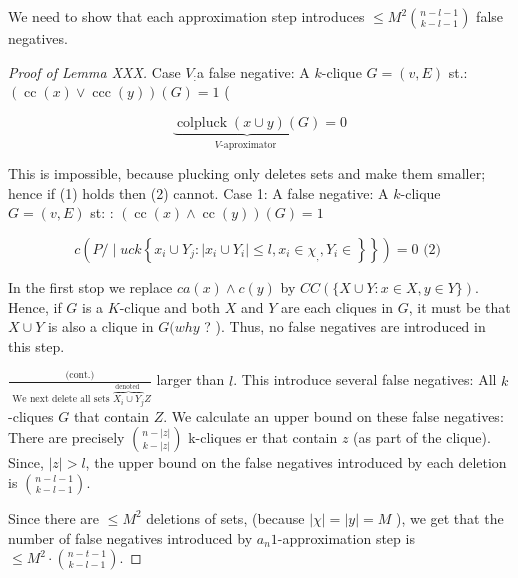 We need to show that each approximation step introduces $\leqslant M^2\binom{n-l-1}{k-l-1}$ false negatives.

\begin{proof}[Proof of Lemma XXX]
Case $V_{:}$a false negative:
A $k$-clique $G=(v, E)$ st.: $(\operatorname{cc}(x) \vee \operatorname{ccc}(y))(G)=1$ (

$$
\underbrace{\operatorname{colpluck}(x \cup y)(G)}_{V \text {-aproximator }}=0
$$


This is impossible, because plucking only deletes sets and make them smaller; hence if (1) holds then (2) cannot.
Case 1:
A false negative:
A $k$-clique $G=(v, E)$ st: : $(\operatorname{cc}(x) \wedge \operatorname{cc}(y))(G)=1$

$$
\left.c\left(P / \mid u c k\left\{x_i \cup Y_j:\left|x_i \cup Y_i\right| \leq l, x_i \in \chi_{,}, Y_i \in\right\}\right\}\right)=0 \text { (2) }
$$


In the first stop we replace $c a(x) \wedge c(y)$ by $C C(\{X \cup Y: x \in X, y \in Y\})$.
Hence, if $G$ is a $K$-clique and both $X$ and $Y$ are each cliques in $G$, it must be that $X \cup Y$ is also a clique in $G(w h y$ ? ). Thus, no false negatives are introduced in this step.


$\frac{\text { (cont.) }}{\text { We next delete all sets } \overbrace{X_i \cup Y_j}^{\text {denoted }} Z}$ larger than $l$. This introduce several false negatives:
All $k$-cliques $G$ that contain $Z$.
We calculate an upper bound on these false negatives: There are precisely $\binom{n-|z|}{k-|z|}$ k-cliques er that contain $z$ (as part of the clique). Since, $|z|>l$, the upper bound on the false negatives introduced by each deletion is $\binom{n-l-1}{k-l-1}$.

Since there are $\leqslant M^2$ deletions of sets, (because $|\chi|=|y|=M$ ), we get that the number of false negatives introduced by $a_n 1$-approximation step is $\leqslant M^2 \cdot\binom{n-t-1}{k-l-1}$.

\end{proof}

